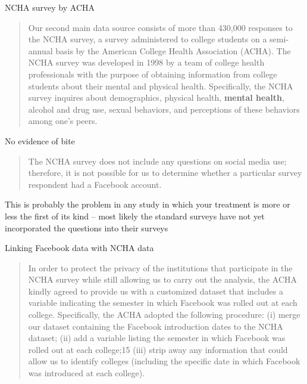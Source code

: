 \documentclass{beamer}
\begin{document}
\begin{frame}{NCHA survey by ACHA}

\begin{quote}
Our second main data source consists of more than 430,000 responses to the NCHA survey, a survey administered to college students on a semi-annual basis by the American College Health Association (ACHA). The NCHA survey was developed in 1998 by a team of college health professionals with the purpose of obtaining information from college students about their mental and physical health. Specifically, the NCHA survey inquires about demographics, physical health, \textbf{mental health}, alcohol and drug use, sexual behaviors, and perceptions of these behaviors among one’s peers.
\end{quote}

\end{frame}

\begin{frame}{No evidence of bite}

\begin{quote}
The NCHA survey does not include any questions on social media use; therefore, it is not possible for us to determine whether a particular survey respondent had a Facebook account.
\end{quote}

\bigskip

This is probably the problem in any study in which your treatment is more or less the first of its kind -- most likely the standard surveys have not yet incorporated the questions into their surveys

\end{frame}

\begin{frame}{Linking Facebook data with NCHA data}

\begin{quote}
In order to protect the privacy of the institutions that participate in the NCHA survey while still allowing us to carry out the analysis, the ACHA kindly agreed to provide us with a customized dataset that includes a variable indicating the semester in which Facebook was rolled out at each college. Specifically, the ACHA adopted the following procedure: (i) merge our dataset containing the Facebook introduction dates to the NCHA dataset; (ii) add a variable listing the semester in which Facebook was rolled out at each college;15 (iii) strip away any information that could allow us to identify colleges (including the specific date in which Facebook was introduced at each college).
\end{quote}

\end{frame}
\end{document}
